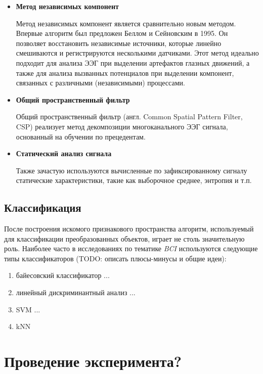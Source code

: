 \documentclass[12pt,fleqn]{article}
\begin{document}
\begin{itemize}
	\item
	{\bf Метод независимых компонент}
	\par Метод независимых компонент является сравнительно новым методом. Впервые алгоритм был предложен Беллом и Сейновским в 1995. Он 
позволяет восстановить независимые источники, которые линейно смешиваются и регистрируются несколькими датчиками. Этот метод 
идеально подходит для анализа ЭЭГ при выделении артефактов глазных движений, а также для анализа вызванных потенциалов при выделении компонент, связанных с различными (независимыми) процессами.
	\item
	{\bf Общий пространственный фильтр}
	\par Общий пространственный фильтр (англ. Common Spatial Pattern Filter, CSP) реализует метод декомпозиции многоканального ЭЭГ сигнала, основанный на обучении по прецедентам.
	\item
	{\bf Статический анализ сигнала}
	\par Также зачастую используются вычисленные по зафиксированному сигналу статические характеристики, такие как выборочное среднее, энтропия и т.п.
	
	\end{itemize}
	\subsection{Классификация}
	\par После построения искомого признакового пространства алгоритм, используемый для классификации преобразованных объектов, играет не столь значительную роль. Наиболее часто в исследованиях по тематике {\it BCI} используются следующие типы классификаторов (TODO: описать плюсы-минусы и общие идеи):
	\begin{enumerate}
	\item
	байесовский классификатор ...
	\item
	линейный дискриминантный анализ ...
	\item
	SVM ...
	\item
	kNN
	\end{enumerate}

\newpage

\section{Проведение эксперимента?}
\end{document}

